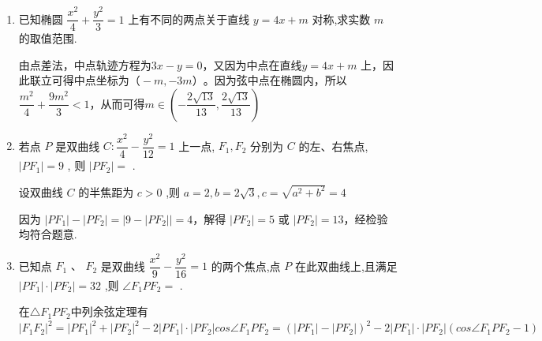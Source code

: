 \begin{enumerate}
    \begin{jieda}
        设 $ A\text{、}B $ 两点的坐标分别为 $ \left( {{x}_{1},{y}_{1}}\right) \text{、}\left( {{x}_{2},{y}_{2}}\right) $ ,则 $\left\{\begin{array}{l}
             {b}^{2}{x}_{1}^{2} + {a}^{2}{y}_{1}^{2} = {a}^{2}{b}^{2}  \\
             {b}^{2}{x}_{2}^{2} + {a}^{2}{y}_{2}^{2} = {a}^{2}{b}^{2} 
        \end{array} \right.$ , 两式相减,得 $ {b}^{2}\left( {{x}_{1} - {x}_{2}}\right) \left( {{x}_{1} + {x}_{2}}\right)  + {a}^{2}\left( {{y}_{1} - {y}_{2}}\right) \left( {{y}_{1} + {y}_{2}}\right)  = 0 $ . 
        
        又点 $ P $ 不在 $ x $ 轴上,故 $ {x}_{1} \neq  {x}_{2} $ . 而$\left\{\begin{array}{l}
             {x}_{1} + {x}_{2} = 2{x}_{0}  \\
             {y}_{1} + {y}_{2} = 2{y}_{0}
        \end{array} \right.$
        
        所以 $ k = \dfrac{{y}_{1} - {y}_{2}}{{x}_{1} - {x}_{2}} =  - \dfrac{{b}^{2}\left( {{x}_{1} + {x}_{2}}\right) }{{a}^{2}\left( {{y}_{1} + {y}_{2}}\right) } =  - \dfrac{{b}^{2}{x}_{0}}{{a}^{2}{y}_{0}} $ .
    \end{jieda}
    
     \item 已知椭圆 $\dfrac{{x}^{2}}{4} + \dfrac{{y}^{2}}{3} = 1$ 上有不同的两点关于直线 $y = {4x} + m$ 对称,求实数 $m$ 的取值范围.
     \begin{jieda}
         由点差法，中点轨迹方程为$3x-y=0$，又因为中点在直线$y = {4x} + m$ 上，因此联立可得中点坐标为$（-m,-3m）$。因为弦中点在椭圆内，所以$\dfrac{m^2}{4}+\dfrac{9m^2}{3}<1$，从而可得$m\in \left(-\dfrac{2\sqrt{13}}{13},\dfrac{2\sqrt{13}}{13}\right)$
     \end{jieda}
    \item 若点 $P$ 是双曲线 $C : \dfrac{{x}^{2}}{4} - \dfrac{{y}^{2}}{12} = 1$ 上一点, ${F}_{1},{F}_{2}$ 分别为 $C$ 的左、右焦点, $\left| {P{F}_{1}}\right|  = 9$ , 则 $\left| {P{F}_{2}}\right|  =$ .
    \begin{jieda}
        设双曲线 $C$ 的半焦距为 $c > 0$ ,则 $a = 2,b = 2\sqrt{3},c = \sqrt{{a}^{2} + {b}^{2}} = 4$
        
        因为 $\left|{P{F}_{1}}\right| - \left|{P{F}_{2}}\right| = \left| {9 - \left|{P{F}_{2}}\right|}\right|  = 4$，解得 $\left| {P{F}_{2}}\right|  = 5$ 或 $\left| {P{F}_{2}}\right|  = {13}$，经检验均符合题意.
    \end{jieda}
    \item 已知点 ${F}_{1}\text{ 、 }{F}_{2}$ 是双曲线 $\dfrac{{x}^{2}}{9} - \dfrac{{y}^{2}}{16} = 1$ 的两个焦点,点 $P$ 在此双曲线上,且满足 $\left| {P{F}_{1}}\right|  \cdot  \left| {P{F}_{2}}\right|  = {32}$ ,则 $\angle {F}_{1}P{F}_{2} =$ .
    \begin{jieda}
        在$\triangle F_1PF_2$中列余弦定理有$|F_1F_2|^2 = |PF_1|^2+|PF_2|^2 - 2|PF_1|\cdot |PF_2| cos\angle {F}_{1}P{F}_{2} = \left(|PF_1|-|PF_2|\right)^2-2|PF_1|\cdot |PF_2| (cos\angle {F}_{1}P{F}_{2} - 1)$


\end{jieda}
\end{enumerate}
